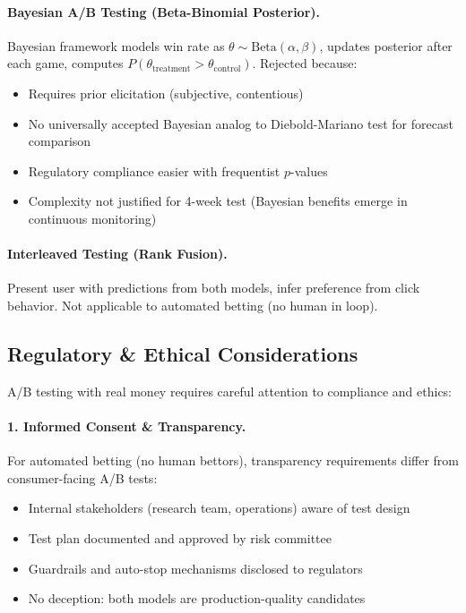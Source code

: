 \paragraph{Bayesian A/B Testing (Beta-Binomial Posterior).}
Bayesian framework models win rate as $\theta \sim \text{Beta}(\alpha, \beta)$, updates posterior after each game, computes $P(\theta_{\text{treatment}} > \theta_{\text{control}})$. Rejected because:
\begin{itemize}[itemsep=2pt,parsep=0pt]
    \item Requires prior elicitation (subjective, contentious)
    \item No universally accepted Bayesian analog to Diebold-Mariano test for forecast comparison
    \item Regulatory compliance easier with frequentist $p$-values
    \item Complexity not justified for 4-week test (Bayesian benefits emerge in continuous monitoring)
\end{itemize}

\paragraph{Interleaved Testing (Rank Fusion).}
Present user with predictions from both models, infer preference from click behavior. Not applicable to automated betting (no human in loop).

\subsection{Regulatory \& Ethical Considerations}

A/B testing with real money requires careful attention to compliance and ethics:

\paragraph{1. Informed Consent \& Transparency.}
For automated betting (no human bettors), transparency requirements differ from consumer-facing A/B tests:
\begin{itemize}[itemsep=2pt,parsep=0pt]
    \item Internal stakeholders (research team, operations) aware of test design
    \item Test plan documented and approved by risk committee
    \item Guardrails and auto-stop mechanisms disclosed to regulators
    \item No deception: both models are production-quality candidates
\end{itemize}

